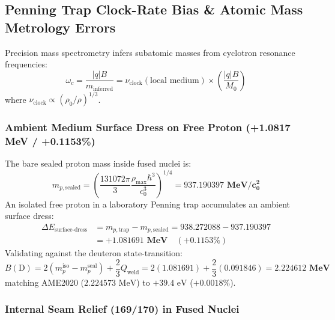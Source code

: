 \documentclass[11pt,a4paper]{article}
\begin{document}
\subsection{Penning Trap Clock-Rate Bias \& Atomic Mass Metrology Errors}
\label{subsec:penning_trap_bias}

Precision mass spectrometry infers subatomic masses from cyclotron resonance frequencies:
\begin{equation}
\omega_c = \frac{|q| B}{m_{\text{inferred}}} = \nu_{\text{clock}}(\text{local medium}) \times \left(\frac{|q| B}{M_0}\right)
\end{equation}
where $\nu_{\text{clock}} \propto (\rho_0 / \rho)^{1/3}$.

\subsubsection{Ambient Medium Surface Dress on Free Proton (+1.0817 MeV / +0.1153\%)}
\label{subsubsec:proton_surface_dress}

The bare sealed proton mass inside fused nuclei is:
\begin{equation}
m_{p,\text{sealed}} = \left( \frac{131072\pi}{3} \frac{\rho_{\max}\hbar^3}{c_0^3} \right)^{1/4} = \mathbf{937.190397\text{ MeV}/c_0^2}
\end{equation}
An isolated free proton in a laboratory Penning trap accumulates an ambient surface dress:
\begin{equation}
\begin{aligned}
\Delta E_{\text{surface-dress}} &= m_{p,\text{trap}} - m_{p,\text{sealed}} = 938.272088 - 937.190397 \\
&= \mathbf{+1.081691\text{ MeV}} \quad (\mathbf{+0.1153\%})
\end{aligned}
\end{equation}
Validating against the deuteron state-transition:
\begin{equation}
B(\text{D}) = 2(m_p^{\text{iso}} - m_p^{\text{seal}}) + \frac{2}{3} Q_{\text{weld}} = 2(1.081691) + \frac{2}{3}(0.091846) = \mathbf{2.224612\text{ MeV}}
\end{equation}
matching AME2020 ($2.224573\text{ MeV}$) to \textbf{$+39.4\text{ eV}$} ($+0.0018\%$).

\subsubsection{Internal Seam Relief (169/170) in Fused Nuclei}
\label{subsubsec:internal_seam_relief}
\end{document}
